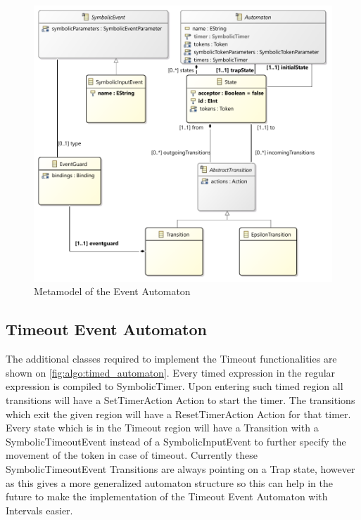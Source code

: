 \begin{figure}[h]
	\centering
	\includegraphics[width=\linewidth]{figures/chapter_5/Basic_automaton_diagram}
	\caption{Metamodel of the Event Automaton}
	\label{fig:algo:basic_automaton}
\end{figure}

\subsection{Timeout Event Automaton}

The additional classes required to implement the Timeout functionalities are shown on \cref{fig:algo:timed_automaton}.
Every timed expression in the regular expression is compiled to SymbolicTimer. Upon entering such timed region all transitions will have a SetTimerAction Action to start the timer. The transitions which exit the given region will have a ResetTimerAction Action for that timer. Every state which is in the Timeout region will have a Transition with a SymbolicTimeoutEvent instead of a SymbolicInputEvent to further specify the movement of the token in case of timeout. Currently these SymbolicTimeoutEvent Transitions are always pointing on a Trap state, however as this gives a more generalized automaton structure so this can help in the future to make the implementation of the Timeout Event Automaton with Intervals easier.

